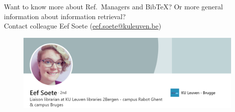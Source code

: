 \begin{frame}[fragile]{Want to know more about Ref.~Managers and BibTeX?}
Or more general information about information retrieval?
\vspace{.5cm}
	\\Contact colleague Eef Soete (\href{mailto:eef.soete@kuleuven.be}{eef.soete@kuleuven.be})
	\somespace
	\begin{figure}
		\includegraphics[width=.5\linewidth]{Figures/Eef_profile}
	\end{figure}
\end{frame}






